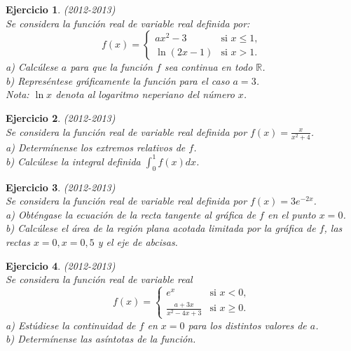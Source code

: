 \documentclass[12pt, a4paper]{amsart}
\newtheorem{ejer}{Ejercicio}
\begin{document}
\begin{ejer}\em (2012-2013)\\
Se considera la función real de variable real definida por:
\begin{equation*}
f(x)=\left \{ \begin{matrix} ax^2-3 & \mbox{si } x\leq 1,
\\ \ln(2x-1) & \mbox{si } x > 1. \end{matrix}\right. 
\end{equation*}
a) Calcúlese $a$ para que la función $f$ sea continua en todo $\mathbb{R}$.\\
b) Represéntese gráficamente la función para el caso $a=3$.\\
Nota: $\ln x$ denota al logaritmo neperiano del número $x$.
\end{ejer}

\begin{ejer}\em (2012-2013)\\
Se considera la función real de variable real definida por $f(x)=\frac{x}{x^2+4}$.\\
a) Determínense los extremos relativos de $f$.\\
b) Calcúlese la integral definida $\int_0^1f(x)dx$.
\end{ejer}

\begin{ejer}\em (2012-2013)\\
Se considera la función real de variable real definida por $f(x)=3e^{-2x}$.\\
a) Obténgase la ecuación de la recta tangente al gráfica de $f$ en el punto $x=0$.\\
b) Calcúlese el área de la región plana acotada limitada por la gráfica de $f$, las rectas $x=0,x=0,5$ y el eje de abcisas.
\end{ejer}

\begin{ejer}\em (2012-2013)\\
Se considera la función real de variable real
\begin{equation*}
f(x)=\left \{ \begin{matrix} e^x & \mbox{si } x<0,
\\ \frac{a+3x}{x^2-4x+3} & \mbox{si } x \geq 0. \end{matrix}\right. 
\end{equation*}
a) Estúdiese la continuidad de $f$ en $x=0$ para los distintos valores de $a$.\\
b) Determínense las asíntotas de la función.
\end{ejer}
\end{document}
